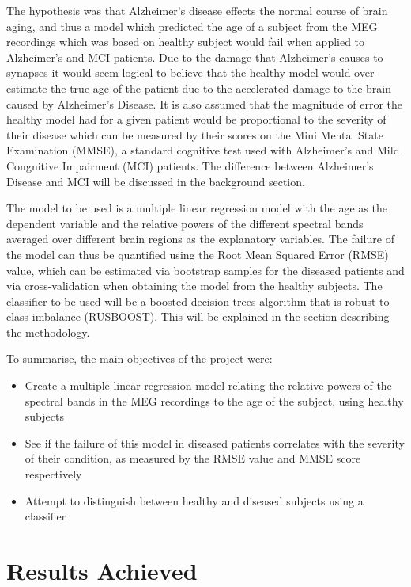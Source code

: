 The hypothesis was that Alzheimer's disease effects the normal course of brain aging, and thus a model which predicted the age of a subject from the MEG recordings which was based on healthy subject would fail when applied to Alzheimer's and MCI patients. Due to the damage that Alzheimer's causes to synapses it would seem logical to believe that the healthy model would over-estimate the true age of the patient due to the accelerated damage to the brain caused by Alzheimer's Disease. It is also assumed that the magnitude of error the healthy model had for a given patient would be proportional to the severity of their disease which can be measured by their scores on the Mini Mental State Examination (MMSE), a standard cognitive test used with Alzheimer's and Mild Congnitive Impairment (MCI) patients. The difference between Alzheimer's Disease and MCI will be discussed in the background section.

The model to be used is a multiple linear regression model with the age as the dependent variable and the relative powers of the different spectral bands averaged over different brain regions as the explanatory variables. The failure of the model can thus be quantified using the Root Mean Squared Error (RMSE) value, which can be estimated via bootstrap samples for the diseased patients and via cross-validation when obtaining the model from the healthy subjects. The classifier to be used will be a boosted decision trees algorithm that is robust to class imbalance (RUSBOOST). This will be explained in the section describing the methodology.

To summarise, the main objectives of the project were:

\begin{itemize}
\item Create a multiple linear regression model relating the relative powers of the spectral bands in the MEG recordings to the age of the subject, using healthy subjects
\item See if the failure of this model in diseased patients correlates with the severity of their condition, as measured by the RMSE value and MMSE score respectively
\item Attempt to distinguish between healthy and diseased subjects using a classifier
\end{itemize}

\section{Results Achieved}

